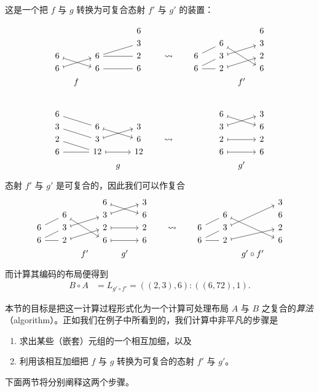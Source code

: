 \noindent 这是一个把 $f$ 与 $g$ 转换为可复合态射 $f'$ 与 $g'$ 的装置：


\[
\begin{tikzcd}[row sep = 1,column sep = 8]
  & &   & & 6 & & & & & & & & 6\\
  & &   & & 3 & & & &  & & 6 \ar[ddrr,mapsto] & & 3 \\
6 \ar[drr,mapsto] & & 6 \ar[rr,-] \ar[rru,-] & & 2 & & \rightsquigarrow & & 6 \ar[urr,-]& & 3 \ar[urr,mapsto] & & 2\\
6 \ar[urr,mapsto] & & 6 \ar[rr,-]  & & 6 & & & & 6 \ar[rr,-] \ar[urr,-] & & 2 \ar[urr,mapsto] & & 6\\
 & f & & & & & & & & & & f' &  \\
 & & & & & & & & & & & & \\[2em]
6 \ar[drr,-] & &    & &    & & & & & & 6 \ar[drr,mapsto] & & 3\\
3 \ar[drr,-] & & 6  \ar[drr,mapsto] & & 3  & & & & & & 3 \ar[urr,mapsto] & & 6\\
2 \ar[drr,-] & & 3  \ar[urr,mapsto] & & 6  & & \rightsquigarrow & & & & 2 \ar[rr,mapsto] & & 2\\
6 \ar[rr,-] & & 12 \ar[rr,mapsto] & & 12 & & & & & & 6 \ar[rr,mapsto] & & 6\\
  & &    &g&    & & & & & &   &g'& \\
\end{tikzcd}
\]
态射 $f'$ 与 $g'$ 是可复合的，因此我们可以作复合
\[ \begin{tikzcd} [row sep = 1, column sep = 8]
              & &        & &  6 \ar[drr,mapsto] & & 3 & & & & & &  & & 3\\
        & &  6 \ar[ddrr,mapsto] & &  3 \ar[urr, mapsto] & & 6 & & & & & & 6 \ar[ddrr,mapsto] & & 6\\
       6 \ar[rru,-] & & 3 \ar[urr,mapsto] & &   2 \ar[rr,mapsto] & & 2  & & \rightsquigarrow & & 6 \ar[urr,-] & & 3 \ar[uurr,mapsto] & & 2\\
       6 \ar[rr,-] \ar[urr,-] & &  2 \ar[urr,mapsto] & &  6 \ar[rr,mapsto] & & 6 & & & & 6 \ar[rr,-] \ar[urr,-] & & 2 \ar[urr,mapsto] & & 6\\
        & & & f' &  & g' & & & & & & & & g' \circ f'& \\
        \end{tikzcd} \]
而计算其编码的布局便得到
        \begin{align*}
        B \circ A & = L_{g' \circ f'} = ((2,3),6):((6,72),1).
        \end{align*}

\noindent 本节的目标是把这一计算过程形式化为一个计算可处理布局 $A$ 与 $B$ 之复合的{\it 算法}（algorithm）。正如我们在例子中所看到的，我们计算中非平凡的步骤是
\begin{enumerate}
    \item 求出某些（嵌套）元组的一个相互加细，以及
    \item 利用该相互加细把 $f$ 与 $g$ 转换为可复合的态射 $f'$ 与 $g'$。
\end{enumerate}
下面两节将分别阐释这两个步骤。


